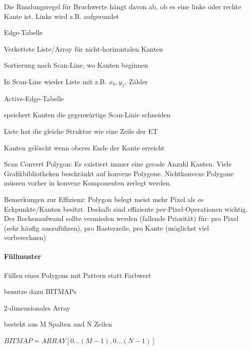 \documentclass[landscape]{article}
\begin{document}
\begin{multicols}{3}
\begin{itemize*}
\begin{itemize*}
      \item Die Rundungsregel für Bruchwerte hängt davon ab, ob es eine linke oder rechte Kante ist. Links wird z.B. aufgerundet
    \end{itemize*}
    \item Edge-Tabelle
    \begin{itemize*}
      \item Verkettete Liste/Array für nicht-horizontalen Kanten
      \item Sortierung nach Scan-Line, wo Kanten beginnen
      \item In Scan-Line wieder Liste mit z.B. $x_0, y_1$, Zähler
    \end{itemize*}
    \item Active-Edge-Tabelle
    \begin{itemize*}
      \item speichert Kanten die gegenwärtige Scan-Linie schneiden
      \item Liste hat die gleiche Struktur wie eine Zeile der ET
      \item Kanten gelöscht wenn oberes Ende der Kante erreicht
    \end{itemize*}
    \item Scan Convert Polygon: Es existiert immer eine gerade Anzahl Kanten. Viele Grafikbibliotheken beschränkt auf konvexe Polygone. Nichtkonvexe Polygone müssen vorher in konvexe Komponenten zerlegt werden.
    \item Bemerkungen zur Effizienz: Polygon belegt meist mehr Pixel als es Eckpunkte/Kanten besitzt. Deshalb sind effiziente per-Pixel-Operationen wichtig. Der Rechenaufwand sollte vermieden werden (fallende Priorität) für: pro Pixel (sehr häufig auszuführen), pro Rasterzeile, pro Kante (möglichst viel vorberechnen)
  \end{itemize*}
  
  \paragraph{Füllmuster}
  \begin{itemize*}
    \item Füllen eines Polygons mit Pattern statt Farbwert
    \item benutze dazu BITMAPs
    \item 2-dimensionales Array
    \item besteht aus M Spalten und N Zeilen
    \item $BITMAP = ARRAY [0... (M-1), 0...(N-1)]$
  \end{itemize*}
  

\end{multicols}
\end{document}
